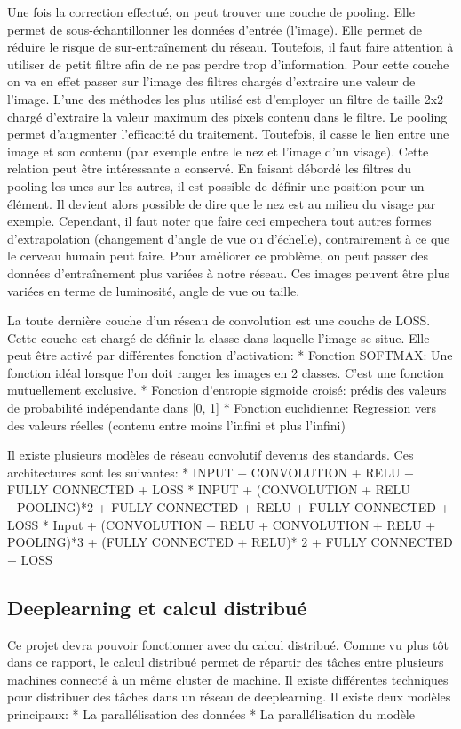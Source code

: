 \documentclass[a4paper,10pt,openany,oneside]{sphinxmanual}
\begin{document}
Une fois la correction effectué, on peut trouver une couche de pooling. Elle permet de sous-échantillonner les données d'entrée (l'image).
Elle permet de réduire le risque de sur-entraînement du réseau. Toutefois, il faut faire attention à utiliser de petit filtre afin de ne
pas perdre trop d'information. Pour cette couche on va en effet passer sur l'image des filtres chargés d'extraire une valeur de l'image.
L'une des méthodes les plus utilisé est d'employer un filtre de taille 2x2 chargé d'extraire la valeur maximum des pixels contenu dans le
filtre. Le pooling permet d'augmenter l'efficacité du traitement. Toutefois, il casse le lien entre une image et son contenu (par exemple
entre le nez et l'image d'un visage). Cette relation peut être intéressante a conservé. En faisant débordé les filtres du pooling les unes
sur les autres, il est possible de définir une position pour un élément. Il devient alors possible de dire que le nez est au milieu du
visage par exemple. Cependant, il faut noter que faire ceci empechera tout autres formes d'extrapolation (changement d'angle de vue ou d'échelle),
contrairement à ce que le cerveau humain peut faire. Pour améliorer ce problème, on peut passer des données d'entraînement plus variées à
notre réseau. Ces images peuvent être plus variées en terme de luminosité, angle de vue ou taille.

La toute dernière couche d'un réseau de convolution est une couche de LOSS. Cette couche est chargé de définir la classe dans laquelle l'image
se situe. Elle peut être activé par différentes fonction d'activation:
* Fonction SOFTMAX: Une fonction idéal lorsque l'on doit ranger les images en 2 classes. C'est une fonction mutuellement exclusive.
* Fonction d'entropie sigmoide croisé: prédis des valeurs de probabilité indépendante dans {[}0, 1{]}
* Fonction euclidienne: Regression vers des valeurs réelles (contenu entre moins l'infini et plus l'infini)

Il existe plusieurs modèles de réseau convolutif devenus des standards. Ces architectures sont les suivantes:
* INPUT + CONVOLUTION + RELU + FULLY CONNECTED + LOSS
* INPUT + (CONVOLUTION + RELU +POOLING)*2 + FULLY CONNECTED + RELU + FULLY CONNECTED + LOSS
* Input + (CONVOLUTION + RELU + CONVOLUTION + RELU + POOLING)*3 + (FULLY CONNECTED + RELU)* 2 + FULLY CONNECTED + LOSS


\subsection{Deeplearning et calcul distribué}
\label{index:deeplearning-et-calcul-distribue}
Ce projet devra pouvoir fonctionner avec du calcul distribué. Comme vu plus tôt dans ce rapport, le calcul distribué permet de répartir des
tâches entre plusieurs machines connecté à un même cluster de machine. Il existe différentes techniques pour distribuer des tâches dans un
réseau de deeplearning. Il existe deux modèles principaux:
* La parallélisation des données
* La parallélisation du modèle
\end{document}
